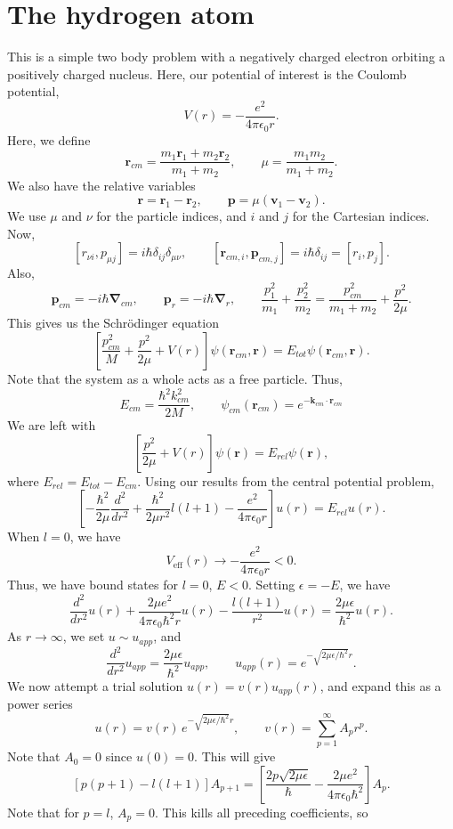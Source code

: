 \documentclass[11pt]{article}
\newcommand\ve[1]{\boldsymbol{#1}}
\newcommand\dd[3][]{\frac{d^{#1}{#2}}{d {#3}^{#1}}}
\newcommand\grad[1]{\ve{\nabla}#1}
\def\vr{\ve{r}}
\def\vp{\ve{p}}
\def\vv{\ve{v}}
\def\vk{\ve{k}}
\theoremstyle{definition}
\theoremstyle{remark}
\numberwithin{equation}{section}
\begin{document}
    \section{The hydrogen atom}
    This is a simple two body problem with a negatively charged electron orbiting a
    positively charged nucleus.
    Here, our potential of interest is the Coulomb potential, \[
        V(r) = -\frac{e^2}{4\pi \epsilon_0 r}.
    \] Here, we define \[
        \vr_{cm} = \frac{m_1\vr_1 + m_2\vr_2}{m_1 + m_2}, \qquad
        \mu = \frac{m_1m_2}{m_1 + m_2}.
    \] We also have the relative variables \[
        \vr = \vr_1 - \vr_2, \qquad \vp = \mu(\vv_1 - \vv_2).
    \] We use $\mu$ and $\nu$ for the particle indices, and $i$ and $j$ for the
    Cartesian indices. Now, \[
        [r_{\nu i}, p_{\mu j}] = i\hbar \delta_{ij}\delta_{\mu\nu}, \qquad
        [\vr_{cm, i}, \vp_{cm, j}] = i\hbar \delta_{ij} = [r_i, p_j].
    \] Also, \[
        \vp_{cm} = -i\hbar\grad{}_{cm}, \qquad 
        \vp_{r} = -i\hbar\grad{}_{r}, \qquad
        \frac{p_1^2}{m_1} + \frac{p_2^2}{m_2} = \frac{p_{cm}^2}{m_1 + m_2} +
        \frac{p^2}{2\mu}.
    \] This gives us the Schr\"odinger equation \[
        \left[\frac{p_{cm}^2}{M} + \frac{p^2}{2\mu} + V(r)\right]\psi(\vr_{cm}, \vr)
        = E_{tot}\psi(\vr_{cm}, \vr).
    \] Note that the system as a whole acts as a free particle. Thus, \[
        E_{cm} = \frac{\hbar^2k_{cm}^2}{2M}, \qquad \psi_{cm}(\vr_{cm}) =
        e^{-\vk_{cm}\cdot\vr_{cm}}
    \] We are left with \[
        \left[\frac{p^2}{2\mu} + V(r)\right]\psi(\vr)
        = E_{rel}\psi(\vr),
    \] where $E_{rel} = E_{tot} - E_{cm}$.
    Using our results from the central potential problem, \[
        \left[-\frac{\hbar^2}{2\mu}\dd[2]{}{r} + \frac{\hbar^2}{2\mu r^2}l(l + 1)
        - \frac{e^2}{4\pi\epsilon_0 r}\right]u(r) = E_{rel} u(r).
    \] When $l = 0$, we have \[
        V_{\text{eff}}(r) \to -\frac{e^2}{4\pi \epsilon_0 r} < 0.
    \] Thus, we have bound states for $l = 0$, $E < 0$. Setting $\epsilon = -E$, we
    have \[
        \dd[2]{}{r}u(r) + \frac{2\mu e^2}{4\pi\epsilon_0 \hbar^2 r}u(r) - \frac{l(l
        + 1)}{r^2}u(r) = \frac{2\mu\epsilon}{\hbar^2}u(r).
    \] As $r \to \infty$, we set $u \sim u_{app}$, and \[
        \dd[2]{}{r}u_{app} = \frac{2\mu \epsilon}{\hbar^2}u_{app}, \qquad
        u_{app}(r) = e^{-\sqrt{2\mu\epsilon / \hbar^2}r}.
    \] We now attempt a trial solution $u(r) = v(r)u_{app}(r)$, and expand this as a
    power series \[
        u(r) = v(r)\,e^{-\sqrt{2\mu\epsilon / \hbar^2}r}, \qquad 
        v(r) = \sum_{p = 1}^\infty A_p r^p.
    \] Note that $A_0 = 0$ since $u(0) = 0$. This will give \[
        \left[p(p + 1) - l(l + 1)\right]A_{p + 1} =
        \left[\frac{2p\sqrt{2\mu\epsilon}}{\hbar} - \frac{2\mu
        e^2}{4\pi\epsilon_0\hbar^2}\right]A_p.
    \] Note that for $p = l$, $A_p = 0$. This kills all preceding coefficients, so
\end{document}
